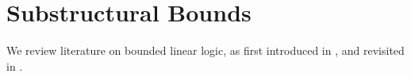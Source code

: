\chapter{Substructural Bounds}

We review literature on bounded linear logic, as first introduced in
\cite{girard-scedorov-scott-1992}, and revisited in
\cite{dal-lago-hofmann-2010}.
